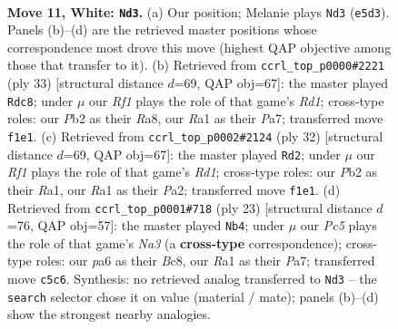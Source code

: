 \documentclass[11pt]{article}
\begin{document}
\clearpage

\begin{figure}[p]\centering
\begin{subfigure}{0.46\textwidth}\centering
\resizebox{\linewidth}{!}{%
\newchessgame
\chessboard[
  setfen={rn1kbb1r/1p3ppp/p3pn2/2P1N3/P1B5/4P3/1P3PPP/RNB2RK1 w - - 2 11},
  showmover=false,
  pgfstyle=straightmove, color=movearrow, markmove={e5-d3}
]}
\caption{}
\end{subfigure}\hfill
\begin{subfigure}{0.46\textwidth}\centering
\resizebox{\linewidth}{!}{%
\newchessgame
\chessboard[
  setfen={r2r2k1/p3ppbp/2p3p1/N1pn1b2/8/2P2N1P/PP1P1PP1/R1B1R1K1 b - - 0 17},
  showmover=false,
  pgfstyle=straightmove, color=movearrow, markmove={d8-c8}
]}
\caption{}
\end{subfigure}
\\[4pt]
\begin{subfigure}{0.46\textwidth}\centering
\resizebox{\linewidth}{!}{%
\newchessgame
\chessboard[
  setfen={r1b1r1k1/pp1p1pp1/2p2n1p/8/n1PN1B2/2P3P1/P3PPBP/R2R2K1 w - - 0 17},
  showmover=false,
  pgfstyle=straightmove, color=movearrow, markmove={d1-d2}
]}
\caption{}
\end{subfigure}\hfill
\begin{subfigure}{0.46\textwidth}\centering
\resizebox{\linewidth}{!}{%
\newchessgame
\chessboard[
  setfen={r1b2rk1/pp2ppbp/n5p1/2pP2B1/4P1n1/1PN2N2/1P3PPP/R3KB1R b KQ - 0 12},
  showmover=false,
  pgfstyle=straightmove, color=movearrow, markmove={a6-b4}
]}
\caption{}
\end{subfigure}
\caption{\textbf{Move 11, White: \texttt{Nd3}.} (a) Our position; Melanie plays \texttt{Nd3} (\texttt{e5d3}). Panels (b)--(d) are the retrieved master positions whose correspondence most drove this move (highest QAP objective among those that transfer to it). (b) Retrieved from \texttt{ccrl\_top\_p0000\#2221} (ply 33) [structural distance $d$=69, QAP obj=67]: the master played \texttt{Rdc8}; under $\mu$ our \emph{Rf1} plays the role of that game's \emph{Rd1}; cross-type roles: our \emph{P}b2 as their \emph{R}a8, our \emph{R}a1 as their \emph{P}a7; transferred move \texttt{f1e1}. (c) Retrieved from \texttt{ccrl\_top\_p0002\#2124} (ply 32) [structural distance $d$=69, QAP obj=67]: the master played \texttt{Rd2}; under $\mu$ our \emph{Rf1} plays the role of that game's \emph{Rd1}; cross-type roles: our \emph{P}b2 as their \emph{R}a1, our \emph{R}a1 as their \emph{P}a2; transferred move \texttt{f1e1}. (d) Retrieved from \texttt{ccrl\_top\_p0001\#718} (ply 23) [structural distance $d$=76, QAP obj=57]: the master played \texttt{Nb4}; under $\mu$ our \emph{Pc5} plays the role of that game's \emph{Na3} (a \textbf{cross-type} correspondence); cross-type roles: our \emph{p}a6 as their \emph{B}c8, our \emph{R}a1 as their \emph{P}a7; transferred move \texttt{c5c6}. Synthesis: no retrieved analog transferred to \texttt{Nd3} -- the \texttt{search} selector chose it on value (material / mate); panels (b)--(d) show the strongest nearby analogies.}
\label{fig:thought-m20}
\end{figure}
\end{document}
